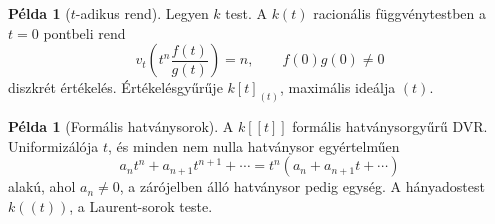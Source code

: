 \documentclass[11pt,a4paper]{article}
\theoremstyle{definition}
\newtheorem{pelda}[tetel]{Példa}
\begin{document}
\begin{pelda}[$t$-adikus rend]
Legyen $k$ test. A $k(t)$ racionális függvénytestben a $t=0$ pontbeli
rend
\[
  v_t\left(t^n\frac{f(t)}{g(t)}\right)=n,
  \qquad f(0)g(0)\neq 0
\]
diszkrét értékelés. Értékelésgyűrűje $k[t]_{(t)}$, maximális ideálja
$(t)$.
\end{pelda}

\begin{pelda}[Formális hatványsorok]\leavevmode\par
A $k[[t]]$ formális hatványsorgyűrű DVR. Uniformizálója $t$, és
minden nem nulla hatványsor egyértelműen
\[
  a_n t^n+a_{n+1}t^{n+1}+\cdots
  =t^n(a_n+a_{n+1}t+\cdots)
\]
alakú, ahol $a_n\neq 0$, a zárójelben álló hatványsor pedig egység.
A hányadostest $k((t))$, a Laurent-sorok teste.
\end{pelda}
\end{document}
